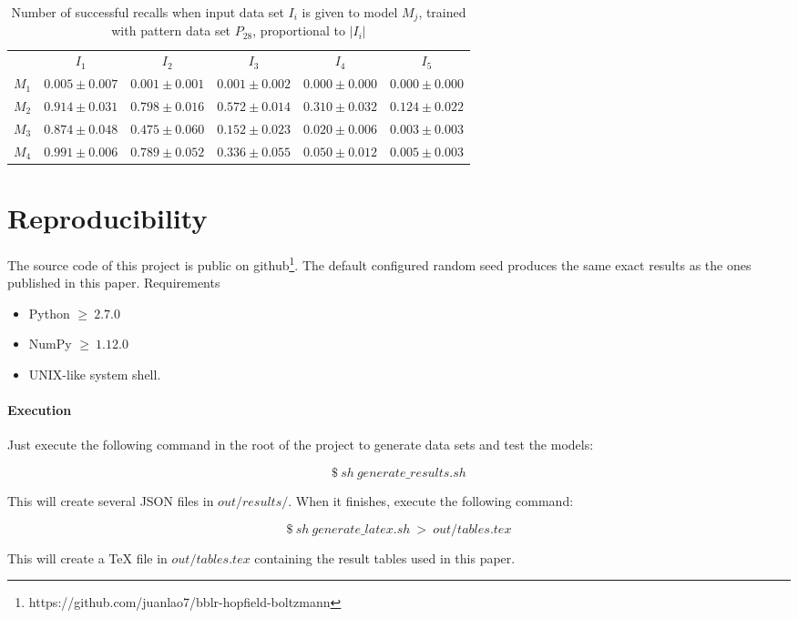 \documentclass[anon]{CI}
\begin{document}
		\begin{table}[H]
			\centering
			\def\arraystretch{1.5}
			\footnotesize
			\begin{tabular}{cccccc}
				
				& $I_{1}$  & $I_{2}$  & $I_{3}$  & $I_{4}$  & $I_{5}$ \\ \cline{2-6}
				$M_{1}$  & $0.005\pm0.007$  & $0.001\pm0.001$  & $0.001\pm0.002$  & $0.000\pm0.000$  & $0.000\pm0.000$ \\
				$M_{2}$  & $0.914\pm0.031$  & $0.798\pm0.016$  & $0.572\pm0.014$  & $0.310\pm0.032$  & $0.124\pm0.022$ \\
				$M_{3}$  & $0.874\pm0.048$  & $0.475\pm0.060$  & $0.152\pm0.023$  & $0.020\pm0.006$  & $0.003\pm0.003$ \\
				$M_{4}$  & $0.991\pm0.006$  & $0.789\pm0.052$  & $0.336\pm0.055$  & $0.050\pm0.012$  & $0.005\pm0.003$ \\
				
			\end{tabular}
			\caption{Number of successful recalls when input data set $I_i$ is given to model $M_j$, trained with pattern data set $P_{28}$, proportional to $\left|I_i\right|$}
		\end{table}
		
	\section{Reproducibility}\label{AppF}
	The source code of this project is public on github\footnote{https://github.com/juanlao7/bblr-hopfield-boltzmann}. The default configured random seed produces the same exact results as the ones published in this paper.
	Requirements
	\begin{itemize}
		\item Python $ \geq \ 2.7.0$
		\item NumPy $ \geq \  1.12.0$
		\item UNIX-like system shell.
	\end{itemize}
	
	\paragraph{Execution}
	Just execute the following command in the root of the project to generate data sets and test the models:
	
	$$\$\ sh\ generate\_results.sh$$
	
	This will create several JSON files in $ out/results/ $. When it finishes, execute the following command:
	
	$$\$\ sh\ generate\_latex.sh\ >\ out/tables.tex$$
	
	This will create a TeX file in $ out/tables.tex $ containing the result tables used in this paper.
	
\end{document}
